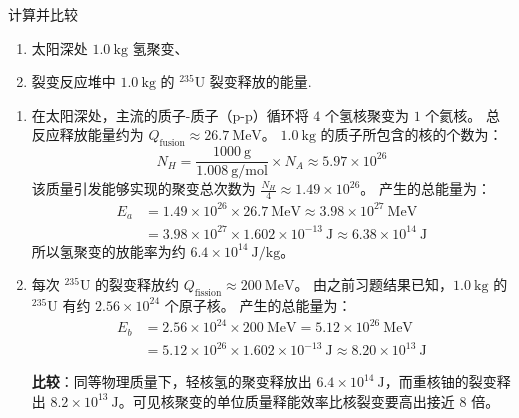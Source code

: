 \begin{exercise}\label{ex:29.35}
计算并比较
\begin{enumerate}
  \item[(a)] 太阳深处 $1.0 \ \mathrm{kg}$ 氢聚变、
  \item[(b)] 裂变反应堆中 $1.0 \ \mathrm{kg}$ 的 $^{235}\mathrm{U}$ 裂变释放的能量.
\end{enumerate}
\end{exercise}
\begin{solution}
\begin{enumerate}
    \item[(a)] 在太阳深处，主流的质子-质子（p-p）循环将 $4$ 个氢核聚变为 $1$ 个氦核。
    总反应释放能量约为 $Q_{\text{fusion}} \approx 26.7 \ \mathrm{MeV}$。
    $1.0 \ \mathrm{kg}$ 的质子所包含的核的个数为：
    $$ N_H = \frac{1000 \ \mathrm{g}}{1.008 \ \mathrm{g/mol}} \times N_A \approx 5.97 \times 10^{26} $$
    该质量引发能够实现的聚变总次数为 $\frac{N_H}{4} \approx 1.49 \times 10^{26}$。
    产生的总能量为：
    \begin{align*}
        E_a &= 1.49 \times 10^{26} \times 26.7 \ \mathrm{MeV} \approx 3.98 \times 10^{27} \ \mathrm{MeV} \\
            &= 3.98 \times 10^{27} \times 1.602 \times 10^{-13} \ \mathrm{J} \approx 6.38 \times 10^{14} \ \mathrm{J}
    \end{align*}
    所以氢聚变的放能率为约 $6.4 \times 10^{14} \ \mathrm{J/kg}$。

    \item[(b)] 每次 $^{235}\mathrm{U}$ 的裂变释放约 $Q_{\text{fission}} \approx 200 \ \mathrm{MeV}$。
    由之前习题结果已知，$1.0 \ \mathrm{kg}$ 的 $^{235}\mathrm{U}$ 有约 $2.56 \times 10^{24}$ 个原子核。
    产生的总能量为：
    \begin{align*}
        E_b &= 2.56 \times 10^{24} \times 200 \ \mathrm{MeV} = 5.12 \times 10^{26} \ \mathrm{MeV} \\
            &= 5.12 \times 10^{26} \times 1.602 \times 10^{-13} \ \mathrm{J} \approx 8.20 \times 10^{13} \ \mathrm{J}
    \end{align*}
    
    \textbf{比较}：同等物理质量下，轻核氢的聚变释放出 $6.4 \times 10^{14} \ \mathrm{J}$，而重核铀的裂变释出 $8.2 \times 10^{13} \ \mathrm{J}$。可见核聚变的单位质量释能效率比核裂变要高出接近 $8$ 倍。
\end{enumerate}
\end{solution}

